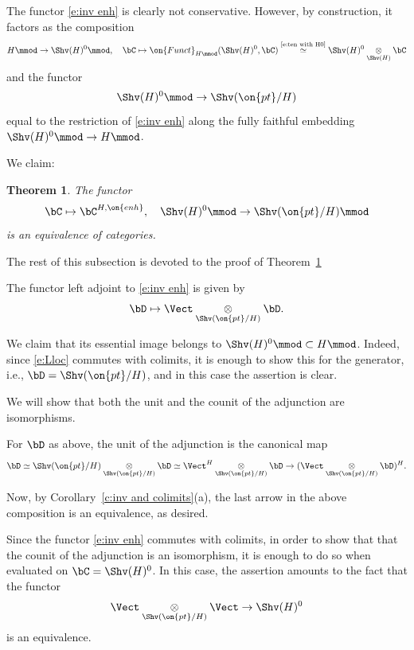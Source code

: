 \documentclass[9pt]{amsart}
\newtheorem{thm}[subsubsection]{Theorem}
\theoremstyle{definition}
\theoremstyle{remark}
\newcommand{\thmref}[1]{Theorem~\ref{#1}}
\newcommand{\corref}[1]{Corollary~\ref{#1}}
\numberwithin{equation}{section}
\begin{document}
\medskip

The functor \eqref{e:inv enh} is clearly not conservative. However, by construction,
it factors as the composition
$$H\mmod\to \Shv(H)^0\mmod, \quad \bC\mapsto 
\on{Funct}_{H\mmod}(\Shv(H)^0,\bC) \overset{\text{\eqref{e:ten with H0}}}\simeq  \Shv(H)^0 \underset{\Shv(H)}\otimes \bC$$
and the functor 
$$\Shv(H)^0\mmod\to \Shv(\on{pt}/H)$$
equal to the restriction of \eqref{e:inv enh} along the fully faithful embedding $\Shv(H)^0\mmod\to H\mmod$.

\sssec{}

We claim:

\begin{thm}  \label{t:reconstr}
The functor 
\begin{equation}  \label{e:enh 0}
\bC\mapsto \bC^{H,\on{enh}},\quad \Shv(H)^0\mmod \to \Shv(\on{pt}/H)\mmod
\end{equation}
is an equivalence of categories.
\end{thm}

The rest of this subsection is devoted to the proof of \thmref{t:reconstr}

\sssec{}

The functor left adjoint to \eqref{e:inv enh} is given by
\begin{equation} \label{e:Lloc}
\bD\mapsto \Vect \underset{\Shv(\on{pt}/H)}\otimes \bD.
\end{equation}

We claim that its essential image belongs to $\Shv(H)^0\mmod\subset H\mmod$. 
Indeed, since \eqref{e:Lloc}
commutes with colimits, it is enough to show this for the generator, i.e., $\bD=\Shv(\on{pt}/H)$, and
in this case the assertion is clear.

\medskip

We will show that both the unit and the counit of the adjunction are isomorphisms. 

\sssec{}

For $\bD$
as above, the unit of the adjunction is the canonical map
$$\bD\simeq \Shv(\on{pt}/H) \underset{\Shv(\on{pt}/H)}\otimes \bD \simeq 
\Vect^H  \underset{\Shv(\on{pt}/H)}\otimes \bD \to (\Vect \underset{\Shv(\on{pt}/H)}\otimes \bD)^H.$$

Now, by \corref{c:inv and colimits}(a), the last arrow in the above composition is an equivalence, as desired.

\sssec{}

Since the functor \eqref{e:inv enh} commutes with colimits, in order to show that that the counit of the adjunction
is an isomorphism, it is enough to do so when evaluated on $\bC=\Shv(H)^0$. In this case, the assertion
amounts to the fact that the functor
\begin{equation} \label{e:rec H0}
\Vect \underset{\Shv(\on{pt}/H)}\otimes \Vect\to \Shv(H)^0
\end{equation}
is an equivalence. 
\end{document}
